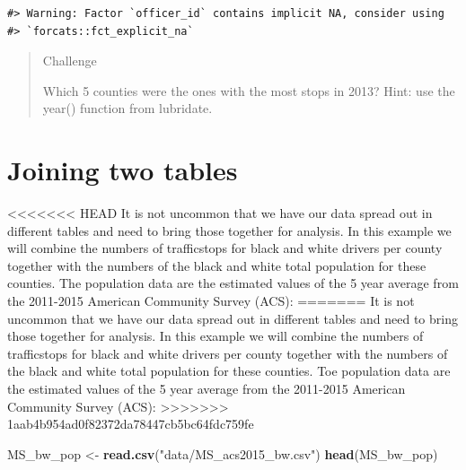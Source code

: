 \documentclass[]{book}
\newenvironment{Shaded}{\begin{snugshade}}{\end{snugshade}}
\newcommand{\CommentTok}[1]{\textcolor[rgb]{0.56,0.35,0.01}{\textit{#1}}}
\newcommand{\KeywordTok}[1]{\textcolor[rgb]{0.13,0.29,0.53}{\textbf{#1}}}
\newcommand{\NormalTok}[1]{#1}
\newcommand{\OperatorTok}[1]{\textcolor[rgb]{0.81,0.36,0.00}{\textbf{#1}}}
\newcommand{\StringTok}[1]{\textcolor[rgb]{0.31,0.60,0.02}{#1}}
\begin{document}
\begin{Shaded}
\end{Shaded}

\begin{verbatim}
#> Warning: Factor `officer_id` contains implicit NA, consider using
#> `forcats::fct_explicit_na`
\end{verbatim}

\begin{quote}
Challenge

Which 5 counties were the ones with the most stops in 2013?
Hint: use the year() function from lubridate.
\end{quote}

\hypertarget{joining-two-tables}{%
\section{Joining two tables}\label{joining-two-tables}}

\textless\textless\textless\textless\textless\textless\textless{} HEAD
It is not uncommon that we have our data spread out in different tables and need to bring those together for analysis. In this example we will combine the numbers of trafficstops for black and white drivers per county together with the numbers of the black and white total population for these counties. The population data are the estimated values of the 5 year average from the 2011-2015 American Community Survey (ACS):
=======
It is not uncommon that we have our data spread out in different tables and need to bring those together for analysis. In this example we will combine the numbers of trafficstops for black and white drivers per county together with the numbers of the black and white total population for these counties. Toe population data are the estimated values of the 5 year average from the 2011-2015 American Community Survey (ACS):
\textgreater\textgreater\textgreater\textgreater\textgreater\textgreater\textgreater{} 1aab4b954ad0f82372da78447cb5bc64fdc759fe

\begin{Shaded}
\begin{Highlighting}[]
\NormalTok{MS_bw_pop <-}\StringTok{ }\KeywordTok{read.csv}\NormalTok{(}\StringTok{"data/MS_acs2015_bw.csv"}\NormalTok{)}
\KeywordTok{head}\NormalTok{(MS_bw_pop)}
\end{Highlighting}
\end{Shaded}
\end{document}
